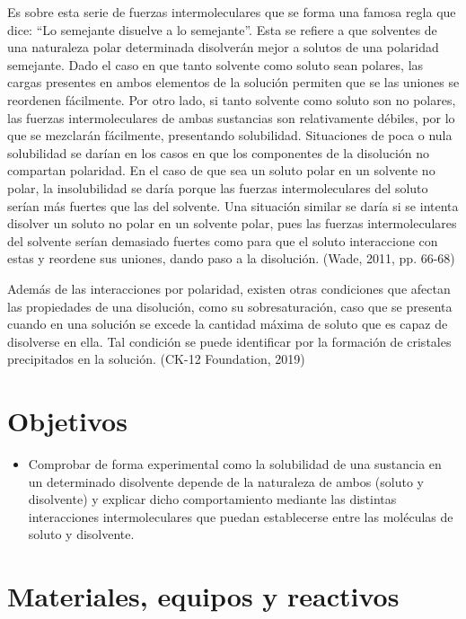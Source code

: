 Es sobre esta serie de fuerzas intermoleculares que se forma una famosa regla que dice: “Lo semejante disuelve a lo semejante”. Esta se refiere a que solventes de una naturaleza polar determinada disolverán mejor a solutos de una polaridad semejante. Dado el caso en que tanto solvente como soluto sean polares, las cargas presentes en ambos elementos de la solución permiten que se las uniones se reordenen fácilmente. Por otro lado, si tanto solvente como soluto son no polares, las fuerzas intermoleculares de ambas sustancias son relativamente débiles, por lo que se mezclarán fácilmente, presentando solubilidad. Situaciones de poca o nula solubilidad se darían en los casos en que los componentes de la disolución no compartan polaridad. En el caso de que sea un soluto polar en un solvente no polar, la insolubilidad se daría porque las fuerzas intermoleculares del soluto serían más fuertes que las del solvente. Una situación similar se daría si se intenta disolver un soluto no polar en un solvente polar, pues las fuerzas intermoleculares del solvente serían demasiado fuertes como para que el soluto interaccione con estas y reordene sus uniones, dando paso a la disolución. (Wade, 2011, pp. 66-68)

Además de las interacciones por polaridad, existen otras condiciones que afectan las propiedades de una disolución, como su sobresaturación, caso que se presenta cuando en una solución se excede la cantidad máxima de soluto que es capaz de disolverse en ella. Tal condición se puede identificar por la formación de cristales precipitados en la solución. (CK-12 Foundation, 2019)

\section{Objetivos}

\begin{itemize}
    \item Comprobar de forma experimental como la solubilidad de una sustancia en un determinado disolvente depende de la naturaleza de ambos (soluto y disolvente) y explicar dicho comportamiento mediante las distintas interacciones intermoleculares que puedan establecerse entre las moléculas de soluto y disolvente.
\end{itemize}

\section{Materiales, equipos y reactivos}

